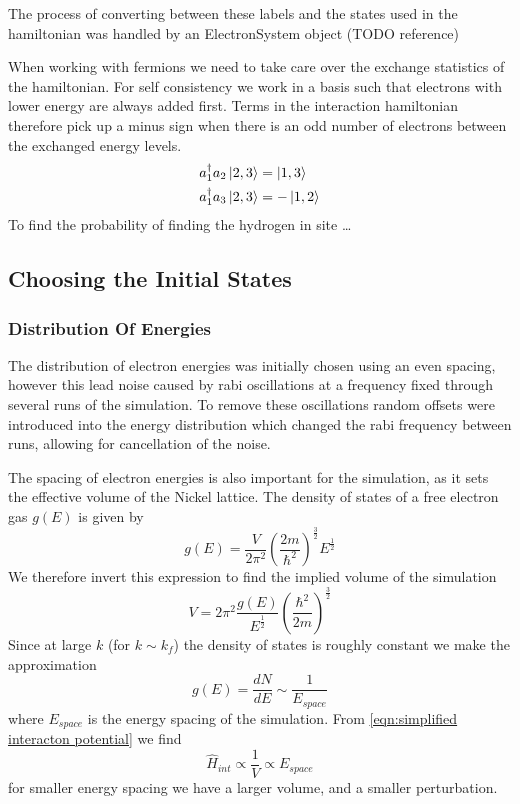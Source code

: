 The process of converting
between these labels and
the states used in the hamiltonian
was handled by
an ElectronSystem object (TODO reference)


When working with
fermions we need to take
care over the exchange
statistics of the hamiltonian.
For self consistency we work in
a basis such that electrons
with lower energy are always
added first. Terms in the interaction
hamiltonian therefore pick
up a minus sign when there is
an odd number of electrons
between the exchanged energy levels.
\begin{align}
    a^\dagger_1a_2 \ket{2,3} & = \ket{1,3}  \\
    a^\dagger_1a_3 \ket{2,3} & = -\ket{1,2}
\end{align}
To find the probability
of finding the hydrogen in site \ldots

\subsection{Choosing the Initial States}

\subsubsection{Distribution Of Energies}
The distribution of electron energies was
initially chosen using an even spacing,
however this lead noise caused
by rabi oscillations
at a frequency
fixed through several runs
of the simulation.
To remove these oscillations
random offsets were introduced
into the energy distribution
which changed the rabi frequency
between runs,
allowing for cancellation
of the noise.

The spacing of electron energies is also
important for the simulation, as it
sets the effective volume of the Nickel
lattice. The density of states of a free electron
gas \(g(E)\) is given by~\cite{KittelCharles1953Itss}
\begin{equation}
    g(E) = \frac{V}{2\pi^2}
    {(\frac{2m}{\hbar^2})}^{\frac{3}{2}}
    E^{\frac{1}{2}}
\end{equation}
We therefore invert this expression
to find the implied volume of the
simulation
\begin{equation}
    V = 2\pi^2
    \frac{g(E)}{E^{\frac{1}{2}}}
    {(\frac{\hbar^2}{2m})}^{\frac{3}{2}}
\end{equation}
Since at large \(k\)
(for \(k\sim k_f\))
the density of states is roughly
constant we make the approximation
\begin{equation}
    g(E) = \frac{dN}{dE} \sim \frac{1}{E_{space}}
\end{equation}
where \(E_{space}\) is the energy spacing
of the simulation. From \cref{eqn:simplified interacton potential} we find
\begin{equation}
    \hat{H}_{int} \propto \frac{1}{V} \propto E_{space}
    \label{eqn:energy spacing dependance of interaction hamiltonian}
\end{equation}
for smaller
energy spacing we have
a larger volume, and a smaller
perturbation.

